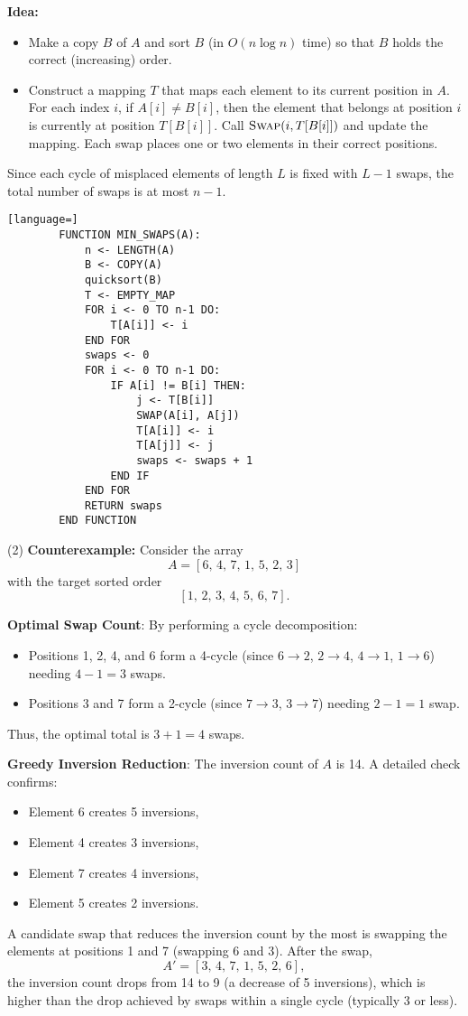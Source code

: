 \documentclass[letterpaper, 11pt]{article}
\newcommand{\1}{\mathds{1}}	%
\theoremstyle{definition}
\newenvironment{solution}{{\par\noindent\it Solution.}}{}
\begin{document}
\begin{solution}
    \textbf{Idea:}
    \begin{itemize}
      \item Make a copy \(B\) of \(A\) and sort \(B\) (in \(O(n\log n)\) time) so that \(B\) holds the correct (increasing) order.
      \item Construct a mapping \(T\) that maps each element to its current position in \(A\). For each index \(i\), if \(A[i] \neq B[i]\), then the element that belongs at position \(i\) is currently at position \(T[B[i]]\). Call \(\textsc{Swap}(i, T[B[i]])\) and update the mapping. Each swap places one or two elements in their correct positions.
    \end{itemize}
    Since each cycle of misplaced elements of length \(L\) is fixed with \(L-1\) swaps, the total number of swaps is at most \(n-1\).
    \begin{lstlisting}[language=]
        FUNCTION MIN_SWAPS(A):
            n <- LENGTH(A)
            B <- COPY(A)
            quicksort(B)
            T <- EMPTY_MAP
            FOR i <- 0 TO n-1 DO:
                T[A[i]] <- i
            END FOR
            swaps <- 0
            FOR i <- 0 TO n-1 DO:
                IF A[i] != B[i] THEN:
                    j <- T[B[i]]
                    SWAP(A[i], A[j])
                    T[A[i]] <- i
                    T[A[j]] <- j
                    swaps <- swaps + 1
                END IF
            END FOR
            RETURN swaps
        END FUNCTION
        \end{lstlisting}
(2)
\textbf{Counterexample:} Consider the array
\[
A = [6,\,4,\,7,\,1,\,5,\,2,\,3]
\]
with the target sorted order
\[
[1,\,2,\,3,\,4,\,5,\,6,\,7].
\]

\textbf{Optimal Swap Count}:
By performing a cycle decomposition:
\begin{itemize}
  \item Positions 1, 2, 4, and 6 form a 4-cycle (since $6\to 2$, $2\to4$, $4\to1$, $1\to6$) needing $4-1=3$ swaps.
  \item Positions 3 and 7 form a 2-cycle (since $7\to3$, $3\to7$) needing $2-1=1$ swap.
\end{itemize}
Thus, the optimal total is $3+1=4$ swaps.

\textbf{Greedy Inversion Reduction}:
The inversion count of \(A\) is 14. A detailed check confirms:
\begin{itemize}
  \item Element 6 creates 5 inversions,
  \item Element 4 creates 3 inversions,
  \item Element 7 creates 4 inversions,
  \item Element 5 creates 2 inversions.
\end{itemize}
A candidate swap that reduces the inversion count by the most is swapping the elements at positions 1 and 7 (swapping 6 and 3). After the swap,
\[
A' = [3,\,4,\,7,\,1,\,5,\,2,\,6],
\]
the inversion count drops from 14 to 9 (a decrease of 5 inversions), which is higher than the drop achieved by swaps within a single cycle (typically 3 or less).


\end{solution}
\end{document}
